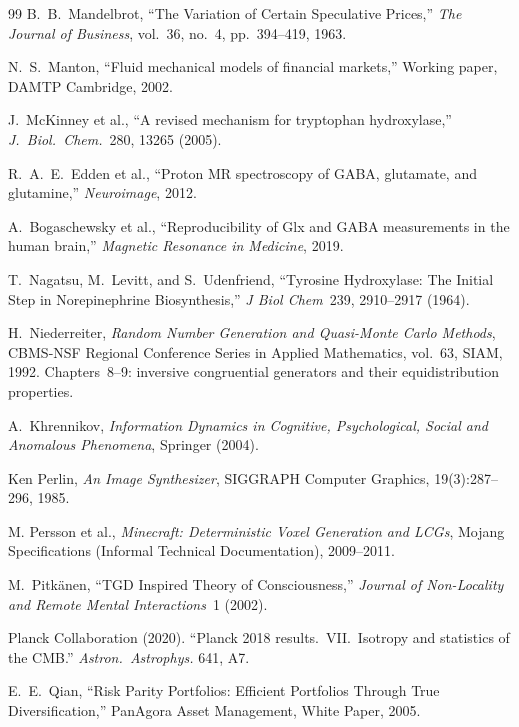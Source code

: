 \documentclass[12pt,oneside]{book}
\begin{document}
\begin{thebibliography}{99}
B.~B.~Mandelbrot,
``The Variation of Certain Speculative Prices,''
\emph{The Journal of Business}, vol.~36, no.~4, pp.~394--419, 1963.

N.~S.~Manton,
``Fluid mechanical models of financial markets,''
Working paper, DAMTP Cambridge, 2002.

J.~McKinney et al., ``A revised mechanism for tryptophan hydroxylase,'' \emph{J.~Biol.~Chem.}\ 280, 13265 (2005).

R.~A.~E.~Edden et al., ``Proton MR spectroscopy of GABA, glutamate, and glutamine,'' \emph{Neuroimage}, 2012.

A.~Bogaschewsky et al., ``Reproducibility of Glx and GABA measurements in the human brain,'' \emph{Magnetic Resonance in Medicine}, 2019.

T.~Nagatsu, M.~Levitt, and S.~Udenfriend, ``Tyrosine Hydroxylase: The Initial Step in Norepinephrine Biosynthesis,'' \emph{J Biol Chem}\ 239, 2910--2917 (1964).

H.~Niederreiter,
\emph{Random Number Generation and Quasi-Monte Carlo Methods},
CBMS-NSF Regional Conference Series in Applied Mathematics, vol.~63, SIAM, 1992.
Chapters~8--9: inversive congruential generators and their equidistribution properties.

A.~Khrennikov, \emph{Information Dynamics in Cognitive, Psychological, Social and Anomalous Phenomena}, Springer (2004).

Ken Perlin,
\textit{An Image Synthesizer},
SIGGRAPH Computer Graphics, 19(3):287--296, 1985.

M. Persson et al.,
\textit{Minecraft: Deterministic Voxel Generation and LCGs},
Mojang Specifications (Informal Technical Documentation), 2009--2011.

M.~Pitk\"anen, ``TGD Inspired Theory of Consciousness,'' \emph{Journal of Non-Locality and Remote Mental Interactions}\ 1 (2002).

Planck Collaboration (2020).
``Planck 2018 results.\ VII.\ Isotropy and statistics of the CMB.''
\textit{Astron.\ Astrophys.} 641, A7.

E.~E.~Qian,
``Risk Parity Portfolios: Efficient Portfolios Through True Diversification,''
PanAgora Asset Management, White Paper, 2005.


\end{thebibliography}
\end{document}
